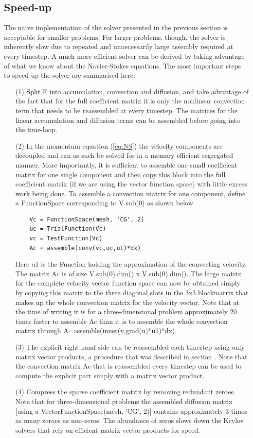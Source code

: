 \subsection{Speed-up}
The naive implementation of the solver presented in the previous section is acceptable for smaller problems. For larger problems, though, the solver is inherently slow due to repeated and unnecessarily large assembly required at every timestep. A much more efficient solver can be derived by taking advantage of what we know about the Navier-Stokes equations. The most important steps to speed up the solver are summarised here:
\begin{itemize}
 \item[(1)] Split F into accumulation, convection and diffusion,  and take advantage of the fact that for the full coefficient matrix it is only the nonlinear convection term that needs to be reassembled at every timestep. The matrices for the linear accumulation and diffusion terms can be assembled before going into the time-loop.
 \item[(2)] In the momentum equation (\ref{eq:NS}) the velocity components are decoupled and can as such be solved for in a memory efficient segregated manner. More importantly, it is sufficient to assemble one small coefficient matrix for one single component and then copy this block into the full coefficient matrix (if we are using the vector function space) with little excess work being done. To assemble a convection matrix for one component, define a FunctionSpace corresponding to V.sub(0) as shown below
\begin{small}
\begin{verbatim}
    Vc = FunctionSpace(mesh, 'CG', 2)
    uc = TrialFunction(Vc)
    vc = TestFunction(Vc)
    Ac = assemble(conv(vc,uc,u1)*dx)
\end{verbatim}
\end{small}
Here u1 is the Function holding the approximation of the convecting velocity. The matrix Ac is of size V.sub(0).dim() x V.sub(0).dim(). The large matrix for the complete velocity vector function space can now be obtained simply by copying this matrix to the three diagonal slots in the 3x3 blockmatrix that makes up the whole convection matrix for the velocity vector. Note that at the time of writing it is for a three-dimensional problem approximately 20 times faster to assemble Ac than it is to assemble the whole convection matrix through A=assemble(inner(v,grad(u)*u1)*dx).
\item[(3)] The explicit right hand side can be reassembled each timestep using only matrix vector products, a procedure that was described in section \cite{langtangen}. Note that the convection matrix Ac that is reassembled every timestep can be used to compute the explicit part simply with a matrix vector product.
\item[(4)] Compress the sparse coefficient matrix by removing redundant zeroes. Note that for three-dimensional problems the assembled diffusion matrix [using a VectorFunctionSpace(mesh, 'CG', 2)] contains approximately 3 times as many zeroes as non-zeros. The abundance of zeros slows down the Krylov solvers that rely on efficient matrix-vector products for speed.
\end{itemize}
